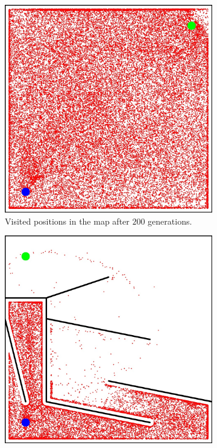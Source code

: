 \begin{figure}[t!]
\centering
\begin{subfigure}[b]{0.3\textwidth}
\includegraphics[width=1.0\textwidth]{../Figures/Misc/MazeEasyNovelty.jpg}
\caption{Visited positions in the map after $200$ generations.}
\label{fig:mazeNoveltyEasy}
\end{subfigure}\hspace{0.3cm}
\begin{subfigure}[b]{0.3\textwidth}
\includegraphics[width=1.0\textwidth]{../Figures/Misc/MazeHardNoveltySolution.jpg}

\end{subfigure}
\end{figure}
